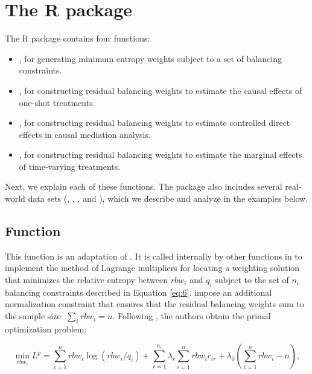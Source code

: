 \hypertarget{r-package}{%
\section{The R package}\label{r-package}}

The R package  contains four functions:

\begin{itemize}
\tightlist
\item
  , for generating minimum entropy weights subject to a set
  of balancing constraints.
\item
  , for constructing residual balancing weights to
  estimate the causal effects of one-shot treatments.
\item
  , for constructing residual balancing weights to
  estimate controlled direct effects in causal mediation analysis.
\item
  , for constructing residual balancing weights to
  estimate the marginal effects of time-varying treatments.
\end{itemize}

Next, we explain each of these functions. The package also includes
several real-world data sets (, ,
, and ), which we describe and
analyze in the examples below.

\hypertarget{eb2}{%
\subsection{\texorpdfstring{Function
}{Function }}\label{eb2}}

This function is an adaptation of  \citep{R-ebal}. It
is called internally by other functions in  to implement
the method of Lagrange multipliers for locating a weighting solution
that minimizes the relative entropy between \(rbw_{i}\) and \(q_{i}\)
subject to the set of \(n_{c}\) balancing constraints described in
Equation \ref{eq:6}. \citet{zhouResidualBalancingMethod2020a} impose an
additional normalization constraint that ensures that the residual
balancing weights sum to the sample size: \(\sum_{i}rbw_{i}=n\).
Following \citet{hainmuellerEntropyBalancingCausal2012}, the authors
obtain the primal optimization problem:

\begin{equation}
\label{eq:8}
\min_{rbw_{i}}L^{p}=\sum^{n}_{i=1}rbw_{i}\log (rbw_{i}/q_{i})+\sum^{n_{c}}_{r=1}\lambda_{r}\sum^{n}_{i=1}rbw_{i}c_{ir}+\lambda_{0}\left(\sum^{n}_{i=1}rbw_{i}-n\right),
\end{equation}


